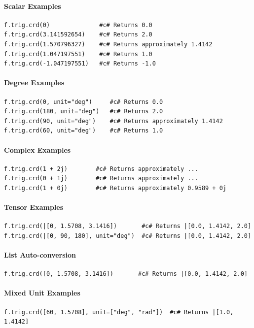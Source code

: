 \paragraph{Scalar Examples}
\begin{verbatim}
f.trig.crd(0)              #c# Returns 0.0
f.trig.crd(3.141592654)    #c# Returns 2.0
f.trig.crd(1.570796327)    #c# Returns approximately 1.4142
f.trig.crd(1.047197551)    #c# Returns 1.0
f.trig.crd(-1.047197551)   #c# Returns -1.0
\end{verbatim}

\paragraph{Degree Examples}
\begin{verbatim}
f.trig.crd(0, unit="deg")     #c# Returns 0.0
f.trig.crd(180, unit="deg")   #c# Returns 2.0
f.trig.crd(90, unit="deg")    #c# Returns approximately 1.4142
f.trig.crd(60, unit="deg")    #c# Returns 1.0
\end{verbatim}

\paragraph{Complex Examples}
\begin{verbatim}
f.trig.crd(1 + 2j)        #c# Returns approximately ...
f.trig.crd(0 + 1j)        #c# Returns approximately ...
f.trig.crd(1 + 0j)        #c# Returns approximately 0.9589 + 0j
\end{verbatim}

\paragraph{Tensor Examples}
\begin{verbatim}
f.trig.crd(|[0, 1.5708, 3.1416])       #c# Returns |[0.0, 1.4142, 2.0]
f.trig.crd(|[0, 90, 180], unit="deg")  #c# Returns |[0.0, 1.4142, 2.0]
\end{verbatim}

\paragraph{List Auto-conversion}
\begin{verbatim}
f.trig.crd([0, 1.5708, 3.1416])       #c# Returns |[0.0, 1.4142, 2.0]
\end{verbatim}

\paragraph{Mixed Unit Examples}
\begin{verbatim}
f.trig.crd([60, 1.5708], unit=["deg", "rad"])  #c# Returns |[1.0, 1.4142]
\end{verbatim}

